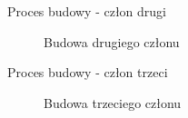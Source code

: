 \documentclass{beamer}
\begin{document}
\begin{frame}{Proces budowy - człon drugi }
\begin{figure}%
	\centering
	\qquad
	\caption{Budowa drugiego członu}
	\label{fig:konstrukcja:czlon2}%
\end{figure}
\end{frame}

\begin{frame}{Proces budowy - człon trzeci }
\begin{figure}%
	\centering
	\qquad
	\caption{Budowa trzeciego członu}
	\label{fig:konstrukcja:czlon3}%
\end{figure}
\end{frame}
\end{document}
